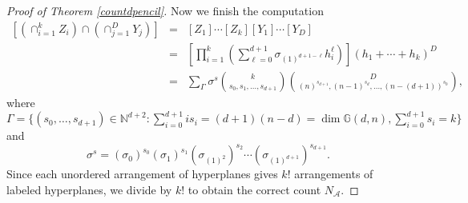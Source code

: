 \documentclass[12pt]{article}
\theoremstyle{plain}
\theoremstyle{definition}
\newcommand{\A}{\mathcal{A}}
\newcommand{\N}{N}
\newcommand{\NN}{\mathbb{N}}
\newcommand{\G}{\mathbb{G}}
\renewcommand{\P}{\ensuremath \mathbb{P}}
\begin{document}
\begin{proof}[Proof of Theorem \ref{countdpencil}]
Now we finish the computation
$$ \begin{array}{lll} [\left( \cap_{i=1}^k Z_i \right) \cap \left( \cap_{j=1}^{D} Y_j
\right)] & = & [Z_1] \cdots [Z_k] [Y_1] \cdots [Y_D] \\
 & = & \left[ \prod_{i=1}^k \left( \sum_{\ell=0}^{d+1} \sigma_{(1)^{d+1-\ell}} h_i^{\ell} \right) \right] \left(
  h_1+\cdots+h_k \right)^{D} \\
& = & \sum_{\Gamma}
\sigma^{s} \binom{k}{s_0,s_1,\ldots,s_{d+1}}
\binom{D}{(n)^{s_{d+1}},(n-1)^{s_{d}},\ldots,(n-(d+1))^{s_0}},
\end{array} $$
where $\Gamma = \{(s_0,\ldots,s_{d+1}) \in \NN^{d+2}: \sum_{i=0}^{d+1} is_i =
(d+1)(n-d) = \dim \G(d,n),
  \sum_{i=0}^{d+1} s_i = k\}$ and $$\sigma^{s} = (\sigma_0)^{s_0}
  (\sigma_1)^{s_1} (\sigma_{(1)^2})^{s_2} \cdots
  (\sigma_{(1)^{d+1}})^{s_{d+1}}.$$ 
Since each unordered arrangement of hyperplanes gives $k!$
arrangements of labeled hyperplanes, we divide by $k!$ to obtain the
correct count $\N_\A$.  \end{proof}





\end{document}
